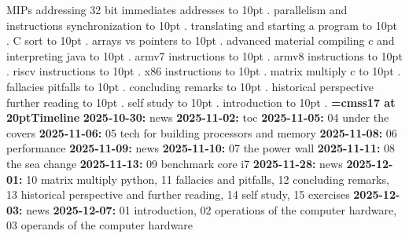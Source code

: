 \smallskip
{} MIPs addressing 32 bit immediates addresses \leaders\hbox to 10pt {\hss.\hss}  \hfill {}
\smallskip
{} parallelism and instructions synchronization \leaders\hbox to 10pt {\hss.\hss}  \hfill {}
\smallskip
{} translating and starting a program \leaders\hbox to 10pt {\hss.\hss}  \hfill {}
\smallskip
{} C sort \leaders\hbox to 10pt {\hss.\hss}  \hfill {}
\smallskip
{} arrays vs pointers \leaders\hbox to 10pt {\hss.\hss}  \hfill {}
\smallskip
{} advanced material compiling c and interpreting java \leaders\hbox to 10pt {\hss.\hss}  \hfill {}
\smallskip
{} armv7 instructions \leaders\hbox to 10pt {\hss.\hss}  \hfill {}
\smallskip
{} armv8 instructions \leaders\hbox to 10pt {\hss.\hss}  \hfill {}
\smallskip
{} riscv instructions \leaders\hbox to 10pt {\hss.\hss}  \hfill {}
\smallskip
{} x86 instructions \leaders\hbox to 10pt {\hss.\hss}  \hfill {}
\smallskip
{} matrix multiply c \leaders\hbox to 10pt {\hss.\hss}  \hfill {}
\smallskip
{} fallacies pitfalls \leaders\hbox to 10pt {\hss.\hss}  \hfill {}
\smallskip
{} concluding remarks \leaders\hbox to 10pt {\hss.\hss}  \hfill {}
\smallskip
{} historical perspective further reading \leaders\hbox to 10pt {\hss.\hss}  \hfill {}
\smallskip
{} self study \leaders\hbox to 10pt {\hss.\hss}  \hfill {}
\smallskip
{} introduction \leaders\hbox to 10pt {\hss.\hss}  \hfill {}
\smallskip
\vfill \break
{\medskip\noindent\bf\font\titlefont=cmss17 at 20pt\titlefont Timeline}\medskip
{\noindent \bf 2025-10-30:} news\smallskip
{\noindent \bf 2025-11-02:} toc\smallskip
{\noindent \bf 2025-11-05:} 04 under the covers\smallskip
{\noindent \bf 2025-11-06:} 05 tech for building processors and memory\smallskip
{\noindent \bf 2025-11-08:} 06 performance\smallskip
{\noindent \bf 2025-11-09:} news\smallskip
{\noindent \bf 2025-11-10:} 07 the power wall\smallskip
{\noindent \bf 2025-11-11:} 08 the sea change\smallskip
{\noindent \bf 2025-11-13:} 09 benchmark core i7\smallskip
{\noindent \bf 2025-11-28:} news\smallskip
{\noindent \bf 2025-12-01:} 10 matrix multiply python, 11 fallacies and pitfalls, 12 concluding remarks, 13 historical perspective and further reading, 14 self study, 15 exercises\smallskip
{\noindent \bf 2025-12-03:} news\smallskip
{\noindent \bf 2025-12-07:} 01 introduction, 02 operations of the computer hardware, 03 operands of the computer hardware\smallskip
